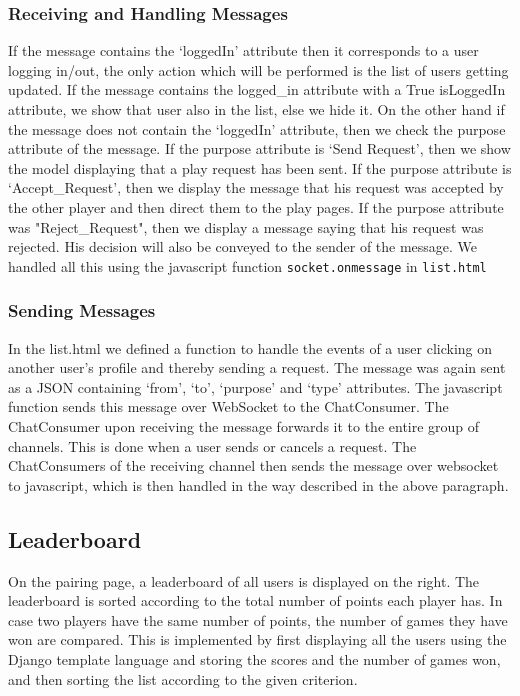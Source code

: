 \documentclass[titlepage]{article}
\begin{document}
\subsubsection{Receiving and Handling Messages}
If the message contains the `loggedIn' attribute then it corresponds to a user logging in/out, the only action which will be performed is the list of users getting updated. If the message contains the logged\_in attribute with a True isLoggedIn attribute, we show that user also in the list, else we hide it.  On the other hand if the message does not contain the `loggedIn' attribute, then we check the purpose attribute of the message. If the purpose attribute is `Send Request', then we show the model displaying that a play request has been sent. If the purpose attribute is `Accept\_Request', then we display the message that his request was accepted by the other player and then direct them to the play pages. If the purpose attribute was "Reject\_Request", then we display a message saying that his request was rejected.  His decision will also be conveyed to the sender of the message. We handled all this using the javascript function \texttt{socket.onmessage} in \texttt{list.html}

\subsubsection{Sending Messages}
In the list.html we defined a function to handle the events of a user clicking on another user's profile and thereby sending a request. The message was again sent as a JSON containing `from', `to', `purpose' and `type' attributes. The javascript function sends this message over WebSocket to the ChatConsumer. The ChatConsumer upon receiving the message forwards it to the entire group of channels. This is done when a user sends or cancels a request. The ChatConsumers of the receiving channel then sends the message over websocket to javascript, which is then handled in the way described in the above paragraph.
\subsection{Leaderboard}
On the pairing page, a leaderboard of all users is displayed on the right. The leaderboard is sorted according to the total number of points each player has. In case two players have the same number of points, the number of games they have won are compared. This is implemented by first displaying all the users using the Django template language and storing the scores and the number of games won, and then sorting the list according to the given criterion.
\end{document}

